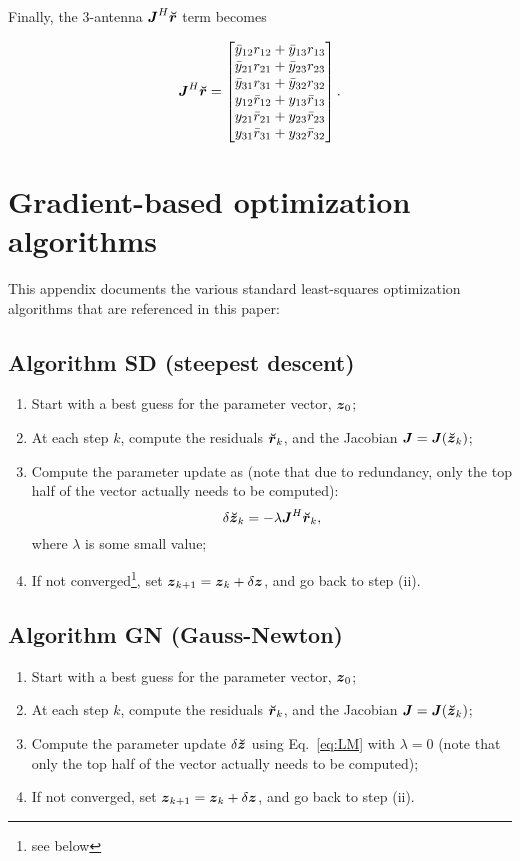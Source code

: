 \documentclass[useAMS,usenatbib]{mn2e}
\newcommand{\zz}{\bmath{z}}
\newcommand{\mat}[1]{{\bmath{#1}}}
\newcommand{\JJ}{\mat{J}} %
\begin{document}
Finally, the 3-antenna $\JJ^H\Rr$ term becomes

\begin{equation}
\label{eq:JHR:3ant}
\JJ^H\Rr = \Matrix{c}{
\bar{y}_{12} r_{12} + \bar{y}_{13} r_{13} \\
\bar{y}_{21} r_{21} + \bar{y}_{23} r_{23} \\
\bar{y}_{31} r_{31} + \bar{y}_{32} r_{32} \\
y_{12} \bar{r}_{12} + y_{13} \bar{r}_{13}   \\
y_{21} \bar{r}_{21} + y_{23} \bar{r}_{23}   \\
y_{31} \bar{r}_{31} + y_{32} \bar{r}_{32}   \\
}.
\end{equation}

\section{Gradient-based optimization algorithms}
\label{sec:algs}

This appendix documents the various standard least-squares optimization algorithms 
that are referenced in this paper:

\subsection{Algorithm SD (steepest descent)}

\begin{enumerate}
\item Start with a best guess for the parameter vector, $\bmath{z}_0$;
\item At each step $k$, compute the residuals $\Rr_k$, and the Jacobian
$\JJ=\JJ(\Zz_k)$;
\item Compute the parameter update as (note that due to redundancy, only the top half of the vector actually needs
to be computed):
\[
\delta\Zz_k = - \lambda \JJ^H \Rr_k,
\]
where $\lambda$ is some small value;
\item If not converged\footnote{see below}, set $\bmath{z}_{k+1}=\bmath{z}_k+\delta\zz$, and go back to step (ii).
\end{enumerate}

\subsection{Algorithm GN (Gauss-Newton)}

\begin{enumerate}
\item Start with a best guess for the parameter vector, $\bmath{z}_0$;
\item At each step $k$, compute the residuals $\Rr_k$, and the Jacobian
$\JJ=\JJ(\Zz_k)$;
\item Compute the parameter update $\delta\Zz$ using Eq.~\ref{eq:LM} with $\lambda=0$ (note that only the top half of the vector actually needs to be computed);
\item If not converged, set $\bmath{z}_{k+1}=\bmath{z}_k+\delta\zz$, and go back to step (ii).
\end{enumerate}
\end{document}
